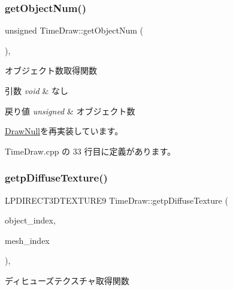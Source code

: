 \subsubsection{\texorpdfstring{get\+Object\+Num()}{getObjectNum()}}
{\footnotesize\ttfamily unsigned Time\+Draw\+::get\+Object\+Num (\begin{DoxyParamCaption}{ }\end{DoxyParamCaption})\hspace{0.3cm}{\ttfamily [override]}, {\ttfamily [virtual]}}



オブジェクト数取得関数 


\begin{DoxyParams}{引数}
{\em void} & なし \\
\hline
\end{DoxyParams}

\begin{DoxyRetVals}{戻り値}
{\em unsigned} & オブジェクト数 \\
\hline
\end{DoxyRetVals}


\mbox{\hyperlink{class_draw_null_a8bddfa6ee87e47b2ecbbe6803b088e37}{Draw\+Null}}を再実装しています。



 Time\+Draw.\+cpp の 33 行目に定義があります。

\mbox{\label{class_time_draw_ac844c99a6d5cdcad9c541779a0e99b22}} 
\subsubsection{\texorpdfstring{getp\+Diffuse\+Texture()}{getpDiffuseTexture()}}
{\footnotesize\ttfamily L\+P\+D\+I\+R\+E\+C\+T3\+D\+T\+E\+X\+T\+U\+R\+E9 Time\+Draw\+::getp\+Diffuse\+Texture (\begin{DoxyParamCaption}\item[{unsigned}]{object\+\_\+index,  }\item[{unsigned}]{mesh\+\_\+index }\end{DoxyParamCaption})\hspace{0.3cm}{\ttfamily [override]}, {\ttfamily [virtual]}}



ディヒューズテクスチャ取得関数 



